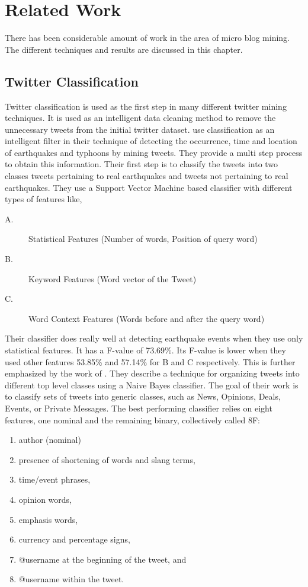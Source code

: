 \chapter{Related Work}
\label{chap-two}
There has been considerable amount of work in the area of micro blog mining. The different techniques and results are discussed in this chapter.

\section{Twitter Classification}
Twitter classification is used as the first step in many different twitter mining techniques. It is used as an intelligent data cleaning method to remove the unnecessary tweets from the initial twitter dataset. \citet{Sakaki:2010:EST:1772690.1772777} use classification as an intelligent filter in their technique of detecting the occurrence, time and location of earthquakes and typhoons by mining tweets. They provide a multi step process to obtain this information. Their first step is to classify the tweets into two classes tweets pertaining to real earthquakes and tweets not pertaining to real earthquakes. They use a Support Vector Machine based classifier with different types of features like,

\begin{description}
\item[A.] Statistical Features (Number of words, Position of query word)
\item[B.] Keyword Features (Word vector of the Tweet)
\item[C.] Word Context Features (Words before and after the query word)
\end{description}

Their classifier does really well at detecting earthquake events when they use only statistical features. It has a F-value of 73.69\%. Its F-value is lower when they used other features 53.85\% and 57.14\% for B and C respectively. This is further emphasized by the work of \citet{Sriram:2010:STC:1835449.1835643}. They describe a technique for organizing tweets into different top level classes using a Naive Bayes classifier. The goal of their work is to classify sets of tweets into generic classes, such as News, Opinions, Deals, Events, or Private Messages. The best performing classifier relies on eight features, one nominal and the remaining binary, collectively called 8F:

\begin{enumerate}
\item author (nominal)
\item presence of shortening of words and slang terms,
\item time/event phrases,
\item opinion words,
\item emphasis words,
\item currency and percentage signs,
\item @username at the beginning of the tweet, and
\item @username within the tweet.
\end{enumerate}

